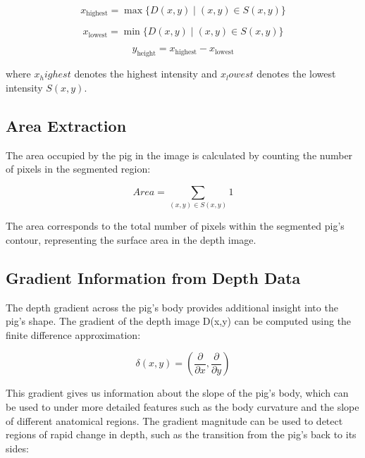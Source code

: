 {\begin{equation}
	x_{\text{highest}} = \max\{D(x, y) \mid (x, y) \in S(x, y)\}
\end{equation}

\begin{equation}
	x_{\text{lowest}} = \min\{D(x, y) \mid (x, y) \in S(x, y)\}
\end{equation}

\begin{equation}
	y_{\text{height}} = x_{\text{highest}} - x_{\text{lowest}}
\end{equation}

where $x_highest$ denotes the highest intensity and $x_lowest$ denotes the lowest intensity $S(x,y)$.

\subsection{Area Extraction}
The area occupied by the pig in the image is calculated by counting the number of pixels in the segmented region:

\begin{equation}
	Area= \sum_{(x, y) \in S(x, y)} 1
\end{equation}

The area corresponds to the total number of pixels within the segmented pig’s contour, representing the surface area in the depth image.

\subsection{Gradient Information from Depth Data}
The depth gradient across the pig’s body provides additional insight into the pig’s shape. The gradient of the depth image D(x,y) can be computed using the finite difference approximation:

\begin{equation}
	\delta(x,y)= (\frac{\partial}{\partial x} , \frac{\partial}{\partial y})
\end{equation}

This gradient gives us information about the slope of the pig’s body, which can be used to under more detailed features such as the body curvature and the slope of different anatomical regions. The gradient magnitude can be used to detect regions of rapid change in depth, such as the transition from the pig’s back to its sides:

}
